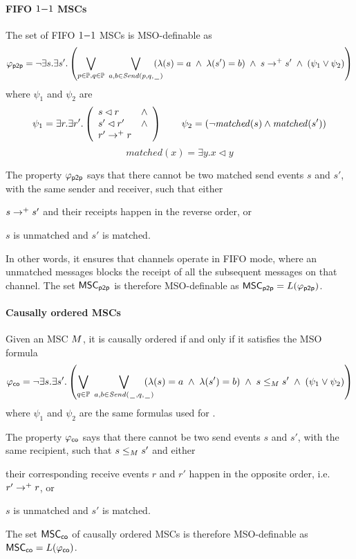\paragraph*{FIFO $1\mathsf{-}1$ MSCs}
	The set of FIFO $1\mathsf{-}1$ MSCs is MSO-definable as
	\[
		\varphi_{\mathsf{p2p}} = \neg \exists s.\exists s'. \left(
		\bigvee_{\substack{p \in \mathbb{P}, q \in \mathbb{P}}}\;
		\bigvee_{\substack{a,b \in {\mathit{Send}(p,q,\hspace{0.1em}\underline{\hspace{0.5em}}\hspace{0.1em})}}}\hspace{-1em}
		(\lambda(s) = a \;\wedge\; \lambda(s') = b) \;\wedge\; s \to^+ s' \;\wedge\;
		(\psi_1 \vee \psi_2 ) 	
		\right)
	\]
	where $\psi_1$ and $\psi_2$ are
	\[
		\psi_1 = \exists r.\exists r'.\left(
		\begin{array}{ll}
			s \lhd r & \wedge\\
			s' \lhd r' & \wedge\\
			r' \to^+ r &
		\end{array} 
		\right) \quad \quad
		\psi_2 = (\neg \mathit{matched}(s) \wedge \mathit{matched}(s'))
		\]
		\[
		matched(x) = \exists y. x \lhd y
	\]

The property $\varphi_{\mathsf{p2p}}$ says that there cannot be two matched send events $s$ and $s'$, with the same sender and receiver, such that either
\begin{enumerate*}[label={(\roman*)}]
	\item $s \to^+ s'$ and their receipts happen in the reverse order, or
	\item $s$ is unmatched and $s'$ is matched.
\end{enumerate*}
In other words, it ensures that channels operate in FIFO mode, where an unmatched messages blocks the receipt of all the subsequent messages on that channel.
The set $\mathsf{MSC}_{\mathsf{p2p}}$ is therefore MSO-definable as $\mathsf{MSC}_{\mathsf{p2p}}=L(\varphi_{\mathsf{p2p}})$.

\paragraph*{Causally ordered MSCs}
Given an MSC $M$, it is causally ordered if and only if it satisfies the MSO formula
\[
	\varphi_{\mathsf{co}} = \neg \exists s.\exists s'. \left(
	\bigvee_{\substack{q \in \mathbb{P}}}\;
	\bigvee_{\substack{a,b \in {\mathit{Send}(\hspace{0.1em}\underline{\hspace{0.5em}}\hspace{0.1em},q,\hspace{0.1em}\underline{\hspace{0.5em}}\hspace{0.1em})}}}\hspace{-1em}
	(\lambda(s) = a \;\wedge\; \lambda(s') = b) \;\wedge\; s \le_M s' \;\wedge\;
	(\psi_1 \vee \psi_2 ) 	
	\right)
\]
where $\psi_1$ and $\psi_2$ are the same formulas used for \pp.

The property $\varphi_{\mathsf{co}}$ says that there cannot be two send events $s$ and $s'$, with the same recipient, such that $s \le_M s'$ and either
\begin{enumerate*}[label={(\roman*)}]
	\item their corresponding receive events $r$ and $r'$ happen in the opposite order, i.e. $r' \to^+ r$, or
	\item $s$ is unmatched and $s'$ is matched.
\end{enumerate*}
The set $\mathsf{MSC}_{\mathsf{co}}$ of causally ordered MSCs is therefore MSO-definable as $\mathsf{MSC}_{\mathsf{co}}=L(\varphi_{\mathsf{co}})$.

